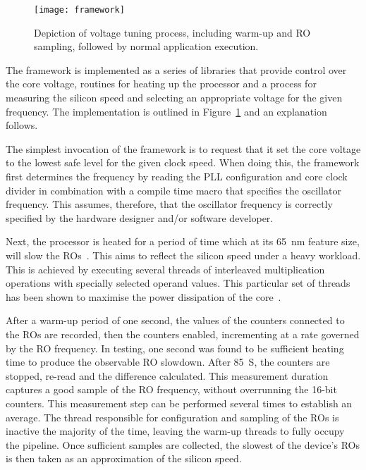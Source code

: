 \documentclass[a4paper,twocolumn,DIV=16]{scrartcl}
\begin{document}
\begin{figure}[htbp]
\centerline{\texttt{[image: framework]}}
\caption{Depiction of voltage tuning process, including warm-up and RO sampling,
followed by normal application execution.}
\label{fig:framework}
\end{figure}

The framework is implemented as a series of libraries that provide control over
the core voltage, routines for heating up the processor and a process for
measuring the silicon speed and selecting an appropriate voltage for the given
frequency. The implementation is outlined in Figure~\ref{fig:framework} and
an explanation follows.

The simplest invocation of the framework is to request that it set the core
voltage to the lowest safe level for the given clock speed. When doing this, the
framework first determines the frequency by reading the PLL configuration and
core clock divider in combination with a compile time macro that specifies the
oscillator frequency. This assumes, therefore, that the oscillator frequency is
correctly specified by the hardware designer and/or software developer.

Next, the processor is heated for a period of time which at its 65~nm feature
size, will slow the ROs~\cite{cmosTempInversion}. This aims to reflect the
silicon speed under a heavy workload. This is achieved by executing several
threads of interleaved multiplication operations with specially selected operand
values. This particular set of threads has been shown to maximise the power
dissipation of the core~\cite{Kerrison2013}.

After a warm-up period of one second, the values of the counters connected to
the ROs are recorded, then the counters enabled, incrementing at a rate governed
by the RO frequency. In testing, one second was found to be sufficient heating
time to produce the observable RO slowdown. After 85~S, the counters are
stopped, re-read and the difference calculated. This measurement duration
captures a good sample of the RO frequency, without overrunning the 16-bit
counters.  This measurement step can be performed several times to establish an
average.  The thread responsible for configuration and sampling of the ROs is
inactive the majority of the time, leaving the warm-up threads to fully occupy
the pipeline.  Once sufficient samples are collected, the slowest of the
device's ROs is then taken as an approximation of the silicon speed.
\end{document}
